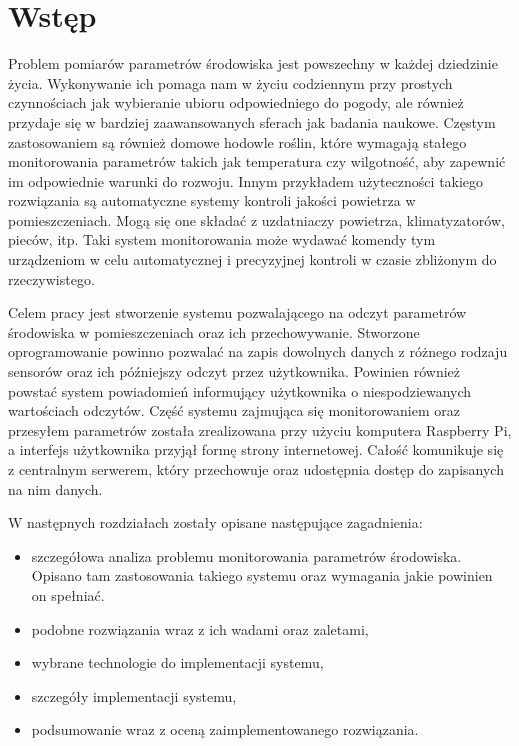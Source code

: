 \chapter{Wstęp}

Problem pomiarów parametrów środowiska jest powszechny w każdej dziedzinie życia.
Wykonywanie ich pomaga nam w życiu codziennym przy prostych czynnościach jak
wybieranie ubioru odpowiedniego do pogody, ale również przydaje się w bardziej
zaawansowanych sferach jak badania naukowe. Częstym zastosowaniem są również
domowe hodowle roślin, które wymagają stałego monitorowania parametrów
takich jak temperatura czy wilgotność, aby zapewnić im odpowiednie warunki
do rozwoju. Innym przykładem użyteczności takiego rozwiązania są automatyczne
systemy kontroli jakości powietrza w pomieszczeniach. Mogą się one składać
z uzdatniaczy powietrza, klimatyzatorów, pieców, itp. Taki system monitorowania
może wydawać komendy tym urządzeniom w celu automatycznej i precyzyjnej kontroli
w czasie zbliżonym do rzeczywistego.

Celem pracy jest stworzenie systemu pozwalającego na odczyt parametrów środowiska
w pomieszczeniach oraz ich przechowywanie. Stworzone oprogramowanie powinno pozwalać
na zapis dowolnych danych z różnego rodzaju sensorów oraz ich późniejszy odczyt
przez użytkownika. Powinien również powstać system powiadomień informujący
użytkownika o niespodziewanych wartościach odczytów.
Część systemu zajmująca się monitorowaniem oraz przesyłem
parametrów została zrealizowana przy użyciu komputera Raspberry Pi, a
interfejs użytkownika przyjął formę strony internetowej. Całość komunikuje się
z centralnym serwerem, który przechowuje oraz udostępnia dostęp do
zapisanych na nim danych.

W następnych rozdziałach zostały opisane następujące zagadnienia:
\begin{itemize}
  \item szczegółowa analiza problemu monitorowania parametrów środowiska.
    Opisano tam zastosowania takiego systemu oraz wymagania jakie powinien
    on spełniać.
  \item podobne rozwiązania wraz z ich wadami oraz zaletami,
  \item wybrane technologie do implementacji systemu,
  \item szczegóły implementacji systemu,
  \item podsumowanie wraz z oceną zaimplementowanego rozwiązania.
\end{itemize}
